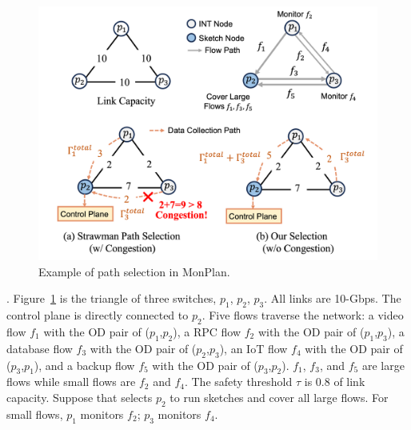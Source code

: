 
\begin{figure}
    \centering
    \includegraphics[width=\linewidth]{pics/example.png}
    \caption{Example of path selection in MonPlan.}
    \label{example}
\end{figure}


. Figure~\ref{example} is the triangle of three switches, $p_1$, $p_2$, $p_3$. All links are 10-Gbps. The control plane is directly connected to $p_2$. Five flows traverse the network: a video flow $f_1$ with the OD pair of ($p_1$,$p_2$), a RPC flow $f_2$ with the OD pair of ($p_1$,$p_3$), a database flow $f_3$ with the OD pair of ($p_2$,$p_3$), an IoT flow $f_4$ with the OD pair of ($p_3$,$p_1$), and a backup flow $f_5$ with the OD pair of ($p_3$,$p_2$). $f_1$, $f_3$, and $f_5$ are large flows while small flows are $f_2$ and $f_4$. The safety threshold $\tau$ is 0.8 of link capacity. 
Suppose that \sysname selects $p_2$ to run sketches and cover all large flows. For small flows, $p_1$ monitors $f_2$; $p_3$ monitors $f_4$. 



